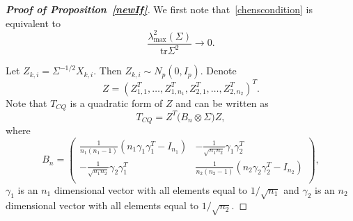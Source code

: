 \documentclass[review]{elsarticle}
\theoremstyle{plain}
\theoremstyle{definition}
\theoremstyle{remark}
\begin{document}
\begin{proof}[\textbf{Proof of Proposition~\ref{newIf}}]
    We first note that~\eqref{chenscondition} is equivalent to
\begin{equation}\label{ChenMaxEigen}
    \frac{\lambda_{\max}^2(\Sigma)}{\mathrm{tr}\Sigma^2}\to 0.
\end{equation}

    Let $Z_{k,i}=\Sigma^{-1/2}X_{k,i}$. Then $Z_{k,i}\sim N_p(0,I_{p})$.
    Denote 
    $$Z={(Z_{1,1}^T,\ldots,Z_{1,n_1}^T,Z_{2,1}^T,\ldots,Z_{2,n_2}^T)}^T.$$
    Note that $T_{CQ}$ is a quadratic form of $Z$ and can be written as
        $$
        T_{CQ}=Z^T \big( B_n\otimes \Sigma \big) Z,
        $$
    where 
    \begin{equation*}
        B_n=\begin{pmatrix}
            \frac{1}{n_1(n_1-1)}(n_1\gamma_1\gamma_1^T-I_{n_1})&
            -\frac{1}{\sqrt{n_1 n_2}}\gamma_1 \gamma_2^T\\
            -\frac{1}{\sqrt{n_1 n_2}}\gamma_2 \gamma_1^T&
            \frac{1}{n_2(n_2-1)}(n_2\gamma_2\gamma_2^T-I_{n_2})\\
        \end{pmatrix},
    \end{equation*}
    $\gamma_1$ is an $n_1$ dimensional vector with all elements equal to $1/\sqrt{n_1}$ and $\gamma_2$ is an $n_2$ dimensional vector with all elements equal to $1/\sqrt{n_2}$.


\end{proof}
\end{document}
